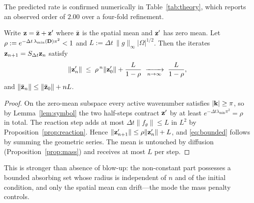 The predicted rate is confirmed numerically in Table~\ref{tab:theory}, which
reports an observed order of $2.00$ over a four-fold refinement.

\begin{proposition}
\label{prop:bounded}
Write $\mathbf{z} = \bar{\mathbf{z}} + \mathbf{z}'$ where $\bar{\mathbf{z}}$ is the spatial mean and
$\mathbf{z}'$ has zero mean. Let $\rho := e^{-\Delta t\,\lambda_{\min}(\mathbf{D})\pi^2}<1$ and
$L := \Delta t\,\|g\|_\infty |\Omega|^{1/2}$. Then the iterates
$\mathbf{z}_{n+1}=S_{\Delta t}\mathbf{z}_n$ satisfy
\begin{equation}
\|\mathbf{z}_n'\| \;\le\; \rho^{\,n}\|\mathbf{z}_0'\| + \frac{L}{1-\rho}
\;\xrightarrow[n\to\infty]{}\; \frac{L}{1-\rho},
\label{eq:bounded}
\end{equation}
and $\|\bar{\mathbf{z}}_n\| \le \|\bar{\mathbf{z}}_0\| + nL$.
\end{proposition}

\begin{proof}
On the zero-mean subspace every active wavenumber satisfies $|\mathbf{k}|\ge\pi$, so by
Lemma~\ref{lem:symbol} the two half-steps contract $\mathbf{z}'$ by at least
$e^{-\Delta t \lambda_{\min}\pi^2}=\rho$ in total. The reaction step adds at most
$\Delta t\|f_\theta\|\le L$ in $L^2$ by Proposition~\ref{prop:reaction}. Hence
$\|\mathbf{z}_{n+1}'\|\le\rho\|\mathbf{z}_n'\|+L$, and \eqref{eq:bounded} follows by summing the
geometric series. The mean is untouched by diffusion
(Proposition~\ref{prop:mass}) and receives at most $L$ per step.
\end{proof}

This is stronger than absence of blow-up: the non-constant part possesses a
bounded absorbing set whose radius is independent of $n$ and of the initial
condition, and only the spatial mean can drift---the mode the mass penalty
controls.

